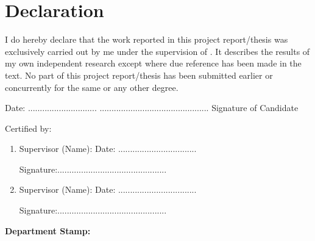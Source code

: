 \chapter*{Declaration}

\begin{spacing}{1}
I do hereby declare that the work reported in this project report/thesis was
exclusively carried out by me under the supervision of {\color{red} \supervisorNameOne}. It describes the results of my own independent research except where due reference has been made in the text. No part of this project report/thesis has been submitted earlier or concurrently for the same or any other degree. 

\vspace{2cm}

Date: ............................. \hspace*{\fill}..............................................
\newline
\hspace*{11cm} Signature of Candidate 

\vspace{2cm}

{\fontsize{11pt}{0pt}\selectfont
Certified by:

\vspace{1cm}

\begin{enumerate}
 \item Supervisor (Name):{\color{red} \supervisorNameOne} \hspace*{\fill} 
    Date: .................................
    
    \vspace{1.5cm}
    Signature:..............................................

    \vspace{2cm}

 \item Supervisor (Name):{\color{red} \supervisorNameTwo} \hspace*{\fill} 
    Date: .................................
    
    \vspace{1.5cm}
    Signature:..............................................
\end{enumerate}

}

\vspace{2cm}

{\fontsize{14pt}{0pt}\selectfont
\textbf{Department Stamp:} 
}

\end{spacing}
